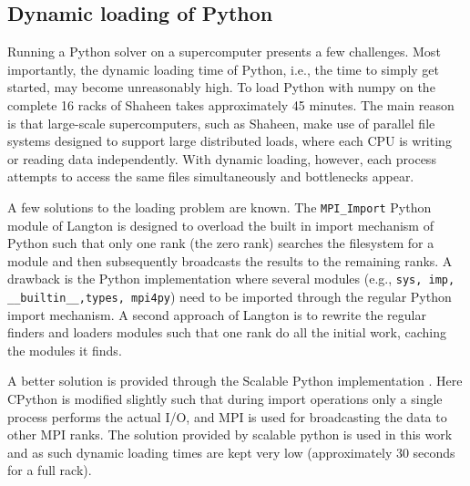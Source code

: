 \documentclass[11pt, oneside]{article}
\newcommand{\inpyth}{\lstinline[style=pythonstyle, basicstyle=\ttfamily]} %[]%
\begin{document}
\subsection{Dynamic loading of Python}
Running a Python solver on a supercomputer presents a few challenges. Most importantly, the dynamic loading time of Python, i.e., the time to simply get started, may become unreasonably high. To load Python with numpy on the complete 16 racks of Shaheen takes approximately 45 minutes. The main reason is that large-scale supercomputers, such as Shaheen, make use of parallel file systems designed to support large distributed loads, where each CPU is writing or reading data independently. With dynamic loading, however, each process attempts to access the same files simultaneously and bottlenecks appear. 

A few solutions to the loading problem are known. The \inpyth{MPI_Import} Python module of Langton \cite{mpi_import} is designed to overload the built in import mechanism of Python such that only one rank (the zero rank) searches the filesystem for a module and then subsequently broadcasts the results to the remaining ranks. A drawback is the Python implementation where several modules (e.g., \inpyth{sys, imp, __builtin__,types, mpi4py}) need to be imported through the regular Python import mechanism. A second approach of Langton is to rewrite the regular finders and loaders modules such that one rank do all the initial work, caching the modules it finds. 

A better solution is provided through the Scalable Python implementation \cite{scalablepython, Enkovaara201117}. Here CPython is modified slightly such that during import operations only a single process performs the actual I/O, and MPI is used for broadcasting the data to other MPI ranks. The solution provided by scalable python is used in this work and as such dynamic loading times are kept very low (approximately 30 seconds for a full rack).
\end{document}
